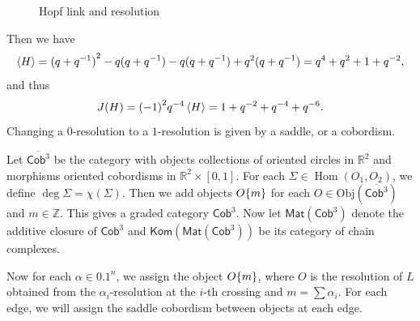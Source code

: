 \documentclass[leqno, openany]{memoir}
\theoremstyle{definition}
\theoremstyle{remark}
\theoremstyle{plain}
\theoremstyle{definition}
\theoremstyle{remark}
\newcommand{\R}{\mathbb{R}}
\newcommand{\Z}{\mathbb{Z}}
\newcommand{\mr}[1]{\mathrm{#1}}
\newcommand{\ms}[1]{\mathsf{#1}}
\newcommand{\ol}[1]{\overline{#1}}
\newcommand{\1}{\mathbf{1}}
\newcommand{\2}{\mathbf{2}}
\newcommand{\3}{\mathbf{3}}
\DeclareMathOperator{\Hom}{Hom}
\begin{document}
\begin{figure}[H]
    \caption{Hopf link and resolution}%
    \label{fig:seb1}
\end{figure}

Then we have
\[ \ev{H} = {(q+q^{-1})}^2 - q(q+q^{-1}) - q(q+q^{-1}) + q^2 (q+q^{-1}) = q^4 + q^2 + 1 + q^{-2}, \]
and thus 
\[ J(H) = {(-1)}^2 q^{-4} \ev{H} = 1 + q^{-2} + q^{-4} + q^{-6}. \]
Changing a $0$-resolution to a $1$-resolution is given by a saddle, or a cobordism.

Let $\ol{\ms{Cob}^3}$ be the category with objects collections of oriented circles in $\R^2$ and morphisms oriented cobordisms in $\R^2 \times [0,1]$. For each $\Sigma \in \Hom(O_1, O_2)$, we define $\deg \Sigma = \chi(\Sigma)$. Then we add objects $O\qty{m}$ for each $O \in \mr{Obj}(\ol{\ms{Cob}^3})$ and $m \in \Z$. This gives a graded category $\ms{Cob}^3$. Now let $\ms{Mat}(\ms{Cob}^3)$ denote the additive closure of $\ms{Cob}^3$ and $\ms{Kom}(\ms{Mat}(\ms{Cob}^3))$ be its category of chain complexes.

Now for each $\alpha \in \qty{0,1}^n$, we assign the object $O\qty{m}$, where $O$ is the resolution of $L$ obtained from the $\alpha_i$-resolution at the $i$-th crossing and $m = \sum \alpha_i$. For each edge, we will assign the saddle cobordism between objects at each edge.
\end{document}
